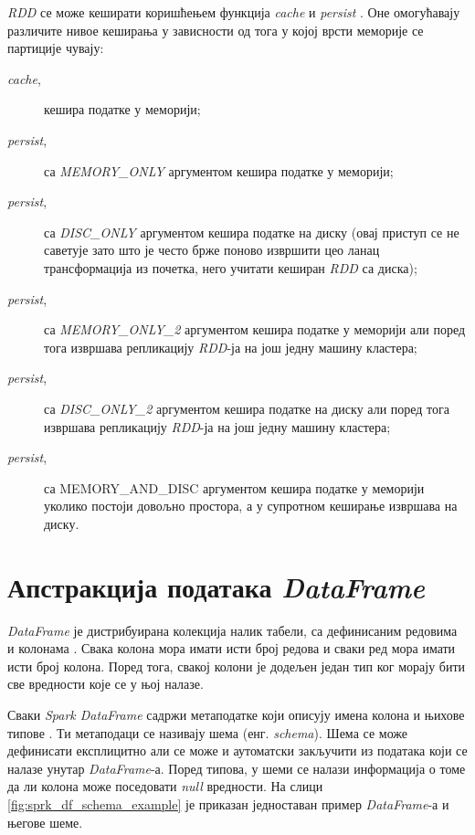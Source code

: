 \documentclass[12pt,oneside]{memoir}
\begin{document}
\textit{RDD} се може кеширати коришћењем функција \textit{cache} и \textit{persist} \cite{spark_rdd}. Оне омогућавају различите нивое кеширања у зависности од тога у којој врсти меморије се партиције чувају:

\begin{description}
	\item[\textit{cache},] кешира податке у меморији;

	\item[\textit{persist},] са \textit{MEMORY\_ONLY} аргументом кешира податке у меморији;

	\item[\textit{persist},] са \textit{DISC\_ONLY} аргументом кешира податке на диску (овај приступ се не саветује зато што је често брже поново извршити цео ланац трансформација из почетка, него учитати кеширан \textit{RDD} са диска);

	\item[\textit{persist},] са \textit{MEMORY\_ONLY\_2} аргументом кешира податке у меморији али поред тога извршава репликацију \textit{RDD}-ја на још једну машину кластера;

	\item[\textit{persist},] са \textit{DISC\_ONLY\_2} аргументом кешира податке на диску али поред тога извршава репликацију \textit{RDD}-ја на још једну машину кластера;

	\item[\textit{persist},] са {MEMORY\_AND\_DISC} аргументом кешира податке у меморији уколико постоји довољно простора, а у супротном кеширање извршава на диску.
\end{description}

\section{Апстракција података \textit{DataFrame}}
\label{sec:spark_df}

\textit{DataFrame} је дистрибуирана колекција налик табели, са дефинисаним редовима и колонама \cite{spark_guide}. Свака колона мора имати исти број редова и сваки ред мора имати исти број колона. Поред тога, свакој колони је додељен један тип ког морају бити све вредности које се у њој налазе.

Сваки \textit{Spark DataFrame} садржи метаподатке који описују имена колона и њихове типове  \cite{spark_guide}. Ти метаподаци се називају шема (енг. \textit{schema}). Шема се може дефинисати експлицитно али се може и аутоматски закључити из података који се налазе унутар \textit{DataFrame}-а. Поред типова, у шеми се налази информација о томе да ли колона може поседовати \textit{null} вредности. На слици \ref{fig:sprk_df_schema_example} је приказан једноставан пример \textit{DataFrame}-а и његове шеме.
\end{document}
